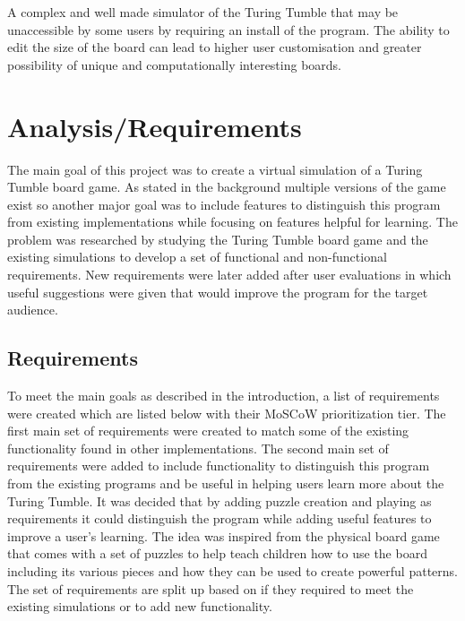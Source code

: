 \documentclass{l4proj}
\begin{document}
A complex and well made simulator of the Turing Tumble that may be unaccessible by some users by requiring an install of the program. The ability to edit the size of the board can lead to higher user customisation and greater possibility of unique and computationally interesting boards. 
\chapter{Analysis/Requirements}
\label{section:reqs}



The main goal of this project was to create a virtual simulation of a Turing Tumble board game. As stated in the background multiple versions of the game exist so another major goal was to include features to distinguish this program from existing implementations while focusing on features helpful for learning. The problem was researched by studying the Turing Tumble board game and the existing simulations to develop a set of functional and non-functional requirements. New requirements were later added after user evaluations in which useful suggestions were given that would improve the program for the target audience.

\section{Requirements}
To meet the main goals as described in the introduction, a list of requirements were created which are listed below with their MoSCoW \citep{noauthor_moscow_nodate} prioritization tier. The first main set of requirements were created to match some of the existing functionality found in other implementations. The second main set of requirements were added to include functionality to distinguish this program from the existing programs and be useful in helping users learn more about the Turing Tumble. It was decided that by adding puzzle creation and playing as requirements it could distinguish the program while adding useful features to improve a user's learning. The idea was inspired from the physical board game that comes with a set of puzzles to help teach children how to use the board including its various pieces and how they can be used to create powerful patterns. The set of requirements are split up based on if they required to meet the existing simulations or to add new functionality.
\end{document}
